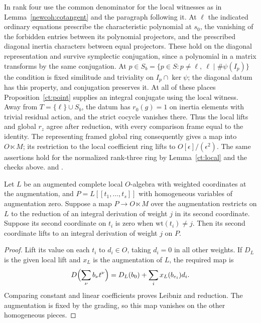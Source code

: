 In rank four use the common denominator for the local witnesses as
in Lemma~\ref{newcoh:cotangent} and the paragraph following it.
At \(\ell\) the indicated ordinary equations prescribe the
characteristic polynomial at \(s_0\), the vanishing of the forbidden
entries between its polynomial projectors, and the prescribed diagonal
inertia characters between equal projectors. These hold on the
diagonal representation and survive symplectic conjugation, since a
polynomial in a matrix transforms by the same conjugation. At
\(p\in S_b=\{p\in S:p\ne\ell,\ \ell\mid\#\psi(I_p)\}\) the condition
is fixed similitude and triviality on \(I_p\cap\ker\psi\); the diagonal
datum has this property, and conjugation preserves it. At all of these
places Proposition~\ref{ct:point} supplies an integral conjugate using
the local witness. Away from \(T=\{\ell\}\cup S_b\), the datum has
\(r_0(g)=1\) on inertia elements with trivial residual action, and the
strict cocycle vanishes there. Thus the local lifts and global \(r_z\)
agree after reduction, with every comparison frame equal to the identity.
The representing framed global ring consequently gives a map into
\(O\ltimes M\); its restriction to the local coefficient ring lifts
to \(O[\epsilon]/(\epsilon^2)\). The same assertions hold for the
normalized rank-three ring by Lemma~\ref{ct:local} and the checks above.
and .

\begin{lemma}\label{ct:lift}
Let \(L\) be an augmented complete local \(O\)-algebra with weighted
coordinates at the augmentation, and \(P=L[[t_1,\ldots,t_s]]\) with
homogeneous variables of augmentation zero. Suppose a map
\(P\to O\ltimes M\) over the augmentation restricts on \(L\) to the
reduction of an integral derivation of weight \(j\) in its second
coordinate. Suppose its second coordinate on \(t_i\) is zero when
\(\mathrm{wt}(t_i)\ne j\). Then its second coordinate lifts to an
integral derivation of weight \(j\) on \(P\).
\end{lemma}
\begin{proof}
Lift its value on each \(t_i\) to \(d_i\in O\), taking \(d_i=0\) in
all other weights. If \(D_L\) is the given local lift and \(x_L\) is
the augmentation of \(L\), the required map is
\[
 D\Bigl(\sum_\nu b_\nu t^\nu\Bigr)
     =D_L(b_0)+\sum_i x_L(b_{e_i})d_i .
\]
Comparing constant and linear coefficients proves Leibniz and
reduction. The augmentation is fixed by the grading, so this map
vanishes on the other homogeneous pieces.
\end{proof}

